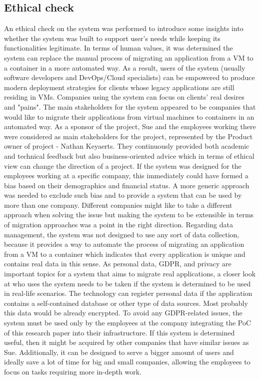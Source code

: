 \documentclass[twocolumn]{article}
\begin{document}
\subsection{Ethical check}
An ethical check on the system was performed to introduce some insights into whether the system was built to support user's needs while keeping its functionalities legitimate. In terms of human values, it was determined the system can replace the manual process of migrating an application from a VM to a container in a more automated way. As a result, users of the system (usually software developers and DevOps/Cloud specialists) can be empowered to produce modern deployment strategies for clients whose legacy applications are still residing in VMs. Companies using the system can focus on clients' real desires and "pains". The main stakeholders for the system appeared to be companies that would like to migrate their applications from virtual machines to containers in an automated way. As a sponsor of the project, Sue and the employees working there were considered as main stakeholders for the project, represented by the Product owner of project - Nathan Keyaerts. They continuously provided both academic and technical feedback but also business-oriented advice which in terms of ethical view can change the direction of a project. If the system was designed for the employees working at a specific company, this immediately could have formed a bias based on their demographics and financial status. A more generic approach was needed to exclude such bias and to provide a system that can be used by more than one company. Different companies might like to take a different approach when solving the issue but making the system to be extensible in terms of migration approaches was a point in the right direction. Regarding data management, the system was not designed to use any sort of data collection, because it provides a way to automate the process of migrating an application from a VM to a container which indicates that every application is unique and contains real data in this sense. As personal data, GDPR, and privacy are important topics for a system that aims to migrate real applications, a closer look at who uses the system needs to be taken if the system is determined to be used in real-life scenarios. The technology can register personal data if the application contains a self-contained database or other type of data sources. Most probably this data would be already encrypted. To avoid any GDPR-related issues, the system must be used only by the employees at the company integrating the PoC of this research paper into their infrastructure. If this system is determined useful, then it might be acquired by other companies that have similar issues as Sue. Additionally, it can be designed to serve a bigger amount of users and ideally save a lot of time for big and small companies, allowing the employees to focus on tasks requiring more in-depth work.
\end{document}
